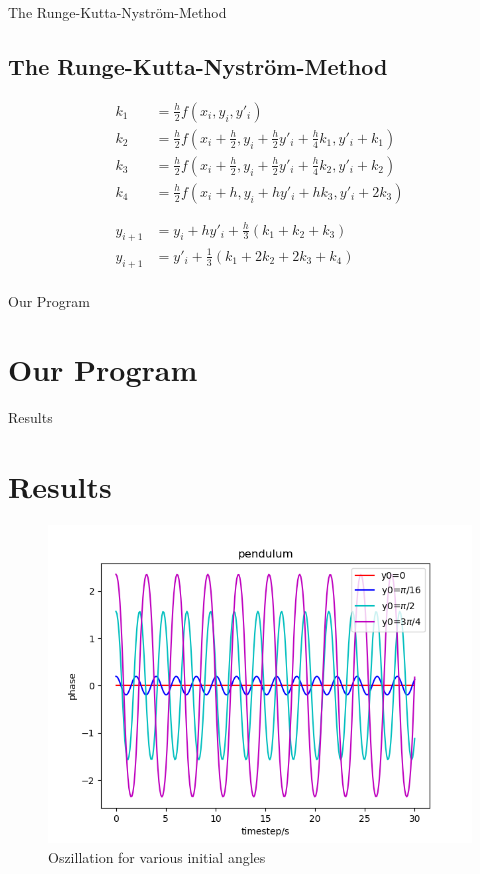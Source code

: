 \documentclass[9pt]{beamer}
\begin{document}
\begin{frame}{The Runge-Kutta-Nyström-Method}
\subsection{The Runge-Kutta-Nyström-Method}
\begin{align*}
k_1 &= \frac{h}{2}f(x_i,y_i,y'_i) \\
k_2 &= \frac{h}{2}f(x_i+\frac{h}{2},y_i+\frac{h}{2}y'_i+\frac{h}{4}k_1,y'_i+k_1) \\
k_3 &= \frac{h}{2}f(x_i+\frac{h}{2},y_i+\frac{h}{2}y'_i+\frac{h}{4}k_2,y'_i+k_2) \\
k_4 &= \frac{h}{2}f(x_i+h,y_i+hy'_i+hk_3,y'_i+2k_3) \\
\\
\\
y_{i+1} &= y_i + hy'_i+\frac{h}{3}(k_1+k_2+k_3)\\
y_{i+1} &= y'_i +\frac{1}{3}(k_1+2k_2+2k_3+k_4)\\
\end{align*}
\end{frame}

\begin{frame}{Our Program}
\section{Our Program}

\end{frame}

\begin{frame}{Results}
\section{Results}
\begin{figure}
\centering
	\includegraphics[scale=0.5]{Figure_1.png}
	\caption{Oszillation for various initial angles}
\end{figure}
\end{frame}
\end{document}

